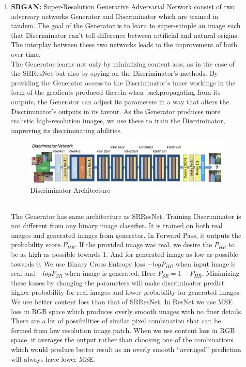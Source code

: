 \begin{enumerate}
    \item {\bf SRGAN:} Super-Resolution Generative Adversarial Network consist of two adversary networks Generator and Discriminator which are trained in tandem. The goal of the Generator is to learn to super-sample an image such that Discriminator can’t tell difference between artificial and natural origins. The interplay between these two networks leads to the improvement of both over time. \\
    The Generator learns not only by minimizing content loss, as in the case of the SRResNet but also by spying on the Discriminator's methods. By providing the Generator access to the Discriminator's inner workings in the form of the gradients produced therein when backpropagating from its outputs, the Generator can adjust its parameters in a way that alters the Discriminator's outputs in its favour. As the Generator produces more realistic high-resolution images, we use these to train the Discriminator, improving its discriminating abilities.
    \begin{figure}[ht]
        \centering
        \includegraphics[width=6in]{./figures/discriminator.png}
        \caption{Discriminator Architecture}
    \end{figure} \\
    The Generator has same architecture as SRResNet. Training Discriminator is not different from any binary image classifier. It is trained on both real images and generated images from generator. In Forward Pass, it outputs the probability score $P_{HR}$. If the provided image was real, we desire the $P_{HR}$ to be as high as possible towards 1. And for generated image as low as possible towards 0. We use Binary Cross Entropy loss $-logP_{HR}$ when input image is real and $-logP_{SR}$ when image is generated. Here $P_{SR}=1-P_{HR}$. Minimizing these losses by changing the parameters will make discriminator predict higher probability for real images and lower probability for generated images.\\
    We use better content loss than that of SRResNet. In ResNet we use MSE loss in RGB space which produces overly smooth images with no finer details. There are a lot of possibilities of similar pixel combination that can be formed from low resolution image patch. When we use content loss in RGB space, it averages the output rather than choosing one of the combinations which would produce better result as an overly smooth “averaged” prediction will always have lower MSE.\\

\end{enumerate}
